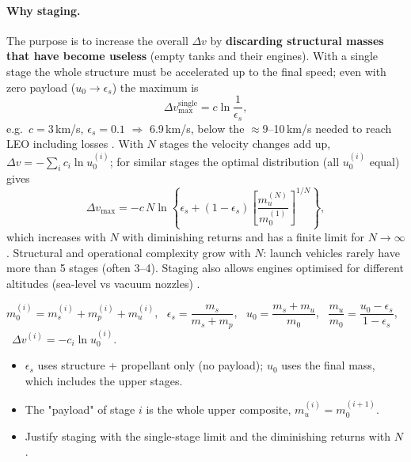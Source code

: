 \paragraph{Why staging.} The purpose is to increase the overall $\Delta v$ by \textbf{discarding structural masses that have become
useless} (empty tanks and their engines). With a single stage the whole structure must be accelerated up to the final speed;
even with zero payload ($u_0\to\epsilon_s$) the maximum is
\begin{equation}
\Delta v_{\max}^{\text{single}}=c\ln\frac{1}{\epsilon_s},
\end{equation}
e.g.\ $c=3$\,km/s, $\epsilon_s=0.1$ $\Rightarrow$ 6.9\,km/s, below the $\approx9$--10\,km/s needed to reach LEO including
losses \notinnotes. With $N$ stages the velocity changes add up, $\Delta v=-\sum_i c_i\ln u_0^{(i)}$; for similar stages the optimal
distribution (all $u_0^{(i)}$ equal) gives
\begin{equation}
\Delta v_{\max}=-c\,N\ln\left\{\epsilon_{s}+(1-\epsilon_{s})\left[\frac{m_{u}^{(N)}}{m_{0}^{(1)}}\right]^{1/N}\right\},
\end{equation}
which increases with $N$ with diminishing returns and has a finite limit for $N\to\infty$. Structural and operational complexity
grow with $N$: launch vehicles rarely have more than 5 stages (often 3--4). Staging also allows engines optimised for
different altitudes (sea-level vs vacuum nozzles) \notinnotes.

\begin{keyf}
$m_0^{(i)}=m_s^{(i)}+m_p^{(i)}+m_u^{(i)}$, \ $\epsilon_s=\dfrac{m_s}{m_s+m_p}$, \ $u_0=\dfrac{m_s+m_u}{m_0}$, \
$\dfrac{m_u}{m_0}=\dfrac{u_0-\epsilon_s}{1-\epsilon_s}$, \ $\Delta v^{(i)}=-c_i\ln u_0^{(i)}$.
\end{keyf}

\pitfalls
\begin{itemize}
\item $\epsilon_s$ uses structure + propellant only (no payload); $u_0$ uses the final mass, which includes the upper stages.
\item The "payload" of stage $i$ is the whole upper composite, $m_u^{(i)}=m_0^{(i+1)}$.
\item Justify staging with the single-stage limit and the diminishing returns with $N$.
\end{itemize}


